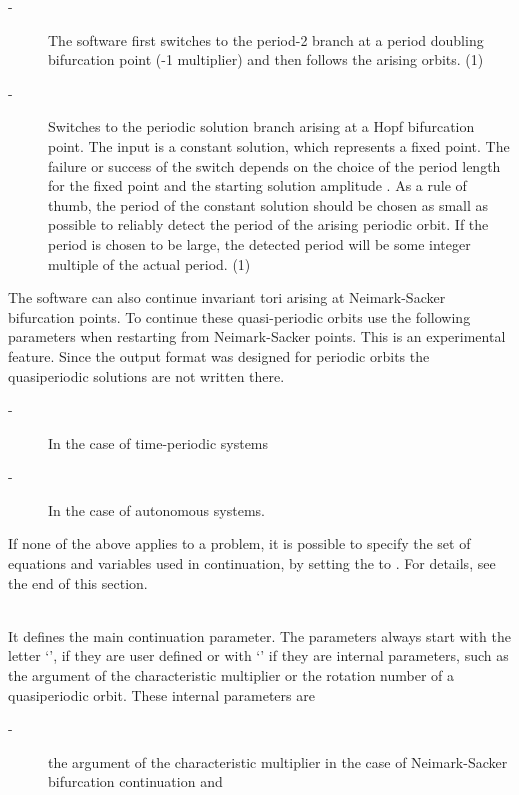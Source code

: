 \documentclass[10pt,a4paper]{ddedoc}
\begin{document}
\begin{description}
\begin{description}
%
\item[ -] The software first switches to the period-2 branch at a period doubling bifurcation point
(-1 multiplier) and then follows the arising orbits. (1)
%
\item[ -] Switches to the periodic solution branch arising at a Hopf bifurcation point. The input is a constant solution, which represents a fixed point. The failure or success of the switch depends on the choice of the period length for the fixed point and the starting solution amplitude . As a rule of thumb, the period of the constant solution should be chosen as small as possible to reliably detect the period of the arising periodic orbit. If the period is chosen to be large, the detected period will be some integer multiple of the actual period. (1)
\end{description}
The software can also continue invariant tori arising at Neimark-Sacker bifurcation points. To continue these quasi-periodic orbits use the following parameters when restarting from Neimark-Sacker points. This is an experimental feature. Since the output format was designed for periodic orbits the quasiperiodic solutions are not written there.
\begin{description}
\item[ -] In the case of time-periodic systems
%
\item[ -] In the case of autonomous systems.
\end{description}
If none of the above applies to a problem, it is possible to specify the set of equations and variables used in continuation, by setting the  to . For details, see the end of this section.
%
\item[\funp{CP}] ~\\
It defines the main continuation parameter. The parameters always start with the letter `', if they are user defined or with `' if they are internal parameters, such as the argument of the characteristic multiplier or
the rotation number of a quasiperiodic orbit.
These  internal parameters are
\begin{description}
\item[ -] the argument of the characteristic multiplier in the case of Neimark-Sacker bifurcation continuation and

\end{description}
\end{description}
\end{document}
